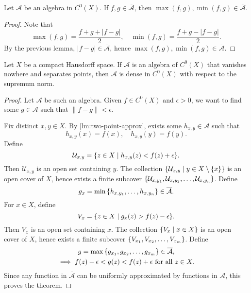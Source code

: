 \begin{lm}
    Let $\mathcal A$ be an algebra in $C^0(X)$. If $f, g \in \overline{\mathcal A}$, then $\max(f, g), \min(f, g) \in \overline{\mathcal A}$.
    \begin{proof}
        Note that
        \[
        \max(f, g) = \frac{f + g + |f - g|}{2}, \quad \min(f, g) = \frac{f + g - |f - g|}{2}.
        \]
        By the previous lemma, $|f - g| \in \overline{\mathcal A}$, hence $\max(f, g), \min(f, g) \in \overline{\mathcal A}$.
    \end{proof}
\end{lm}

\begin{thm}
    Let $X$ be a compact Hausdorff space. If $\mathcal A$ is an algebra of $C^0(X)$ that vanishes nowhere and separates points, then $\mathcal A$ is dense in $C^0(X)$ with respect to the supremum norm.
    \begin{proof}
        Let $\mathcal A$ be such an algebra. Given $f \in C^0(X)$ and $\epsilon > 0$, we want to find some $g \in \mathcal A$ such that $\|f - g\| < \epsilon$.
        
        Fix distinct $x, y \in X$. By \ref{lm:two-point-approx}, exists some $h_{x, y} \in \mathcal A$ such that
        \[
        h_{x, y}(x) = f(x), \quad h_{x, y}(y) = f(y).
        \]
        Define
        \[
        \mathcal U_{x, y} = {\left\{{z \in X \mid h_{x, y}(z) < f(z) + \epsilon}\right\}}.
        \]
        Then $\mathcal U_{x, y}$ is an open set containing $y$. The collection ${\left\{{\mathcal U_{x, y} \mid y \in X \setminus {\left\{{x}\right\}}}\right\}}$ is an open cover of $X$, hence exists a finite subcover ${\left\{{\mathcal U_{x, y_1}, \mathcal U_{x, y_2}, \ldots, \mathcal U_{x, y_n}}\right\}}$. Define
        \[
        g_x = \min{\left\{{h_{x, y_1}, \ldots, h_{x, y_n}}\right\}} \in \overline{\mathcal A}.
        \]
        For $x \in X$, define 
        \[
        V_x = {\left\{{z \in X \mid g_x(z) > f(z) - \epsilon}\right\}}.
        \]
        Then $V_x$ is an open set containing $x$. The collection ${\left\{{V_x \mid x \in X}\right\}}$ is an open cover of $X$, hence exists a finite subcover ${\left\{{V_{x_1}, V_{x_2}, \ldots, V_{x_m}}\right\}}$. Define
        \begin{gather*}
            g = \max{\left\{{g_{x_1}, g_{x_2}, \ldots, g_{x_m}}\right\}} \in \overline{\mathcal A}, \\
            \implies f(z) - \epsilon < g(z) < f(z) + \epsilon \text{ for all } z \in X.
        \end{gather*}
        Since any function in $\overline{\mathcal A}$ can be uniformly approximated by functions in $\mathcal A$, this proves the theorem.
    \end{proof}
\end{thm}

